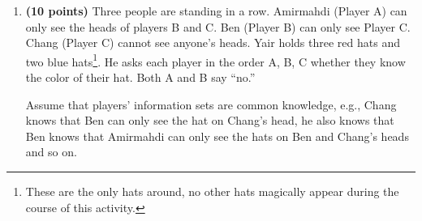 \documentclass[11pt]{article}
\begin{document}
\begin{enumerate}[label=\textbf{\arabic*.}, leftmargin=*]
Assume \(\omega \in K_i(A)\),
\[
F_i(\omega)\subseteq A
\]
Take any \(\omega' \in F_i(\omega)\). Since \(F_i\) is a partition and
\(\omega'\) is in the same information set as \(\omega\),
\[
F_i(\omega')=F_i(\omega)
\]
Thus,
\[
F_i(\omega')\subseteq A
\]
\[
\omega'\in K_i(A)
\]
Since this holds for every \(\omega'\in F_i(\omega)\), we have
\[
F_i(\omega)\subseteq K_i(A)
\]
Therefore,
\[
\omega\in K_i(K_i(A))
\]
So,
\[
K_i(A)\subseteq K_i(K_i(A))
\]

By part (b), we take \( B = K_i(A)\),
\[
K_i(K_i(A))\subseteq K_i(A)
\]

Therefore,
\[
K_i(K_i(A))=K_i(A)
\]

\textbf{d)}

By part (b), we take \(B = (K_i(A))^c\),
\[
K_i((K_i(A))^c)\subseteq (K_i(A))^c
\]

Now assume \(\omega\in (K_i(A))^c\). Then
\[
\omega\notin K_i(A)
\]
\[
F_i(\omega)\nsubseteq A
\]
Take any \(\omega'\in F_i(\omega)\). Since \(F_i\) is a partition and
\(\omega'\) is in the same information set as \(\omega\),
\[
F_i(\omega')=F_i(\omega)
\]
Hence,
\[
F_i(\omega')\nsubseteq A
\]
\[
\omega'\notin K_i(A)
\]
\[
\omega'\in (K_i(A))^c
\]
Since this holds for every \(\omega'\in F_i(\omega)\), we have
\[
F_i(\omega)\subseteq (K_i(A))^c
\]
Thus,
\[
\omega\in K_i((K_i(A))^c)
\]
\[
(K_i(A))^c\subseteq K_i((K_i(A))^c)
\]

Hence,
\[
(K_i(A))^c = K_i((K_i(A))^c)
\]

\textbf{e)}

Assume \(A\subseteq B\). Take any \(\omega\in K_i(A)\). Then
\[
F_i(\omega)\subseteq A
\]
Since
\[
A\subseteq B
\]
we have
\[
F_i(\omega)\subseteq B
\]
Therefore,
\[
\omega\in K_i(B)
\]
Hence,
\[
K_i(A)\subseteq K_i(B)
\]

\newpage

\item \textbf{(10 points)} Three people are standing in a row. Amirmahdi (Player A) can only see the heads of players B and C. Ben (Player B) can only see Player C. Chang (Player C) cannot see anyone's heads. Yair holds three red hats and two blue hats\footnote{These are the only hats around, no other hats magically appear during the course of this activity.}. He asks each player in the order A, B, C whether they know the color of their hat. Both A and B say ``no.''

Assume that players' information sets are common knowledge, e.g., Chang knows that Ben can only see the hat on Chang's head, he also knows that Ben knows that Amirmahdi can only see the hats on Ben and Chang's heads and so on.


\end{enumerate}
\end{document}
